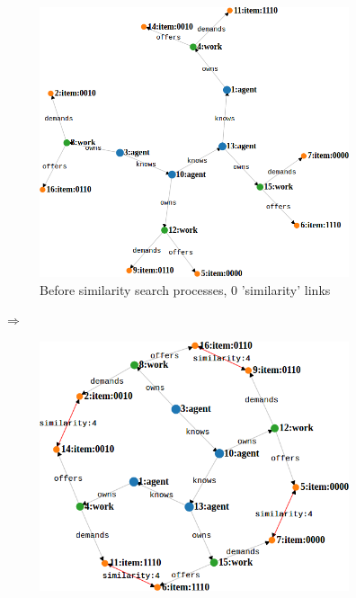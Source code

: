 \documentclass{article}
\begin{document}
\begin{figure}[H]
    \centering
    \captionsetup{justification=centering, size=scriptsize}
    \begin{subfigure}{0.45\textwidth}
        \includegraphics[width=1\textwidth]{toy_graph_before_processes.png}
      \caption{Before similarity search processes, 0 'similarity' links}
      \label{fig:small-before-processes}
    \end{subfigure}
	$\Rightarrow$
    \begin{subfigure}{0.45\textwidth}
        \includegraphics[width=1\textwidth]{toy_graph_after_processes.png}

\end{subfigure}
\end{figure}
\end{document}
